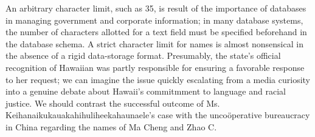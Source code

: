 An arbitrary character limit, such as 35, is result of the importance of
databases in managing government and corporate information; in many database
systems, the number of characters allotted for a text field must be specified
beforehand in the database schema. A strict character limit for names is almost
nonsensical in the absence of a rigid data-storage format. Presumably, the
state's official recognition of Hawaiian was partly responsible for ensuring a
favorable response to her request; we can imagine the issue quickly escalating
from a media curiosity into a genuine debate about Hawaii's commitmment to
language and racial justice. We should contrast the successful outcome of Ms.
Keihanaikukauakahihuliheekahaunaele's case with the uncoöperative bureaucracy in
China regarding the names of Ma Cheng and Zhao C.
